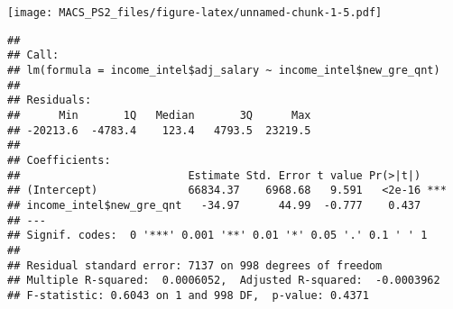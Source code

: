 \documentclass[]{article}
\newenvironment{Shaded}{\begin{snugshade}}{\end{snugshade}}
\newcommand{\KeywordTok}[1]{\textcolor[rgb]{0.13,0.29,0.53}{\textbf{{#1}}}}
\newcommand{\DataTypeTok}[1]{\textcolor[rgb]{0.13,0.29,0.53}{{#1}}}
\newcommand{\DecValTok}[1]{\textcolor[rgb]{0.00,0.00,0.81}{{#1}}}
\newcommand{\StringTok}[1]{\textcolor[rgb]{0.31,0.60,0.02}{{#1}}}
\newcommand{\CommentTok}[1]{\textcolor[rgb]{0.56,0.35,0.01}{\textit{{#1}}}}
\newcommand{\NormalTok}[1]{{#1}}
\begin{document}
\begin{Shaded}
\end{Shaded}

\texttt{[image: MACS\_PS2\_files/figure-latex/unnamed-chunk-1-5.pdf]}

\begin{Shaded}
\end{Shaded}

\begin{verbatim}
## 
## Call:
## lm(formula = income_intel$adj_salary ~ income_intel$new_gre_qnt)
## 
## Residuals:
##      Min       1Q   Median       3Q      Max 
## -20213.6  -4783.4    123.4   4793.5  23219.5 
## 
## Coefficients:
##                          Estimate Std. Error t value Pr(>|t|)    
## (Intercept)              66834.37    6968.68   9.591   <2e-16 ***
## income_intel$new_gre_qnt   -34.97      44.99  -0.777    0.437    
## ---
## Signif. codes:  0 '***' 0.001 '**' 0.01 '*' 0.05 '.' 0.1 ' ' 1
## 
## Residual standard error: 7137 on 998 degrees of freedom
## Multiple R-squared:  0.0006052,  Adjusted R-squared:  -0.0003962 
## F-statistic: 0.6043 on 1 and 998 DF,  p-value: 0.4371
\end{verbatim}
\end{document}
